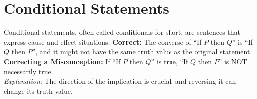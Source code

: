 \documentclass[12pt]{article}
\newenvironment{correct}{\noindent\textbf{Correct:}}{\\}
\newenvironment{misconception}{\noindent\textbf{Correcting a Misconception:}}{\\}
\newenvironment{explanation}{\noindent\textit{Explanation}:}{\\\vspace{1em}}
\begin{document}
\section*{Conditional Statements}
Conditional statements, often called conditionals for short, are sentences that express cause-and-effect situations.
\begin{correct} The converse of ``If \(P\) then \(Q\)'' is ``If \(Q\) then \(P\)'', and it might not have the same truth value as the original statement. \end{correct}
\begin{misconception} If ``If \(P\) then \(Q\)'' is true, ``If \(Q\) then \(P\)'' is NOT necessarily true. \end{misconception}
\begin{explanation} The direction of the implication is crucial, and reversing it can change its truth value. \end{explanation}
\end{document}
